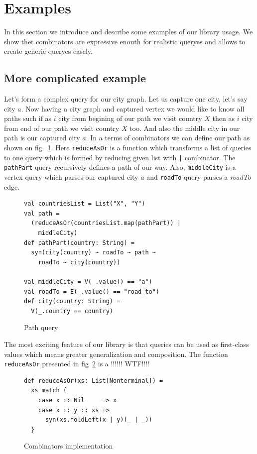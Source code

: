 \section{Examples}

In this section we introduce and describe some examples of our library usage.
We show thet combinators are expressive enouth for realistic queryes and allows to create generic queryes easely.

\subsection{More complicated example}

Let's form a complex query for our city graph. 
Let us capture one city, let's say city $a$. 
Now having a city graph and captured vertex we would like to know all paths such if as $i$ city from begining of our path we visit country $X$ then as $i$ city from end of our path we visit country $X$ too. 
And also the middle city in our path is our captured city $a$.
In a terms of combinators we can define our path as shown on fig.~\ref{fig:pathQuery}.
Here \lstinline{reduceAsOr} is a function which transforms a list of queries to one query which is formed by reducing given list with \lstinline{|} combinator.
The \lstinline{pathPart} query recursively defines a path of our way.
Also, \lstinline{middleCity} is a vertex query which parses our captured city $a$ and \lstinline{roadTo} query parses a \emph{roadTo} edge.

\begin{figure}[h]
\begin{lstlisting}
val countriesList = List("X", "Y")
val path = 
  (reduceAsOr(countriesList.map(pathPart)) | 
    middleCity)
def pathPart(country: String) =
  syn(city(country) ~ roadTo ~ path ~ 
    roadTo ~ city(country))

val middleCity = V(_.value() == "a")
val roadTo = E(_.value() == "road_to")
def city(country: String) =
  V(_.country == country)
\end{lstlisting}
\caption{Path query}
\label{fig:pathQuery}
\end{figure}


The most exciting feature of our library is that queries can be used as first-class values which means greater generalization and composition. 
The function \lstinline{reduceAsOr} presented in fig~\ref{fig:reduceAsOr} is a !!!!!! WTF!!!!

\begin{figure}[h]
\begin{lstlisting}
def reduceAsOr(xs: List[Nonterminal]) = 
  xs match {
    case x :: Nil     => x
    case x :: y :: xs => 
      syn(xs.foldLeft(x | y)(_ | _))
  }
\end{lstlisting}
\caption{Combinators implementation}
\label{fig:reduceAsOr}
\end{figure}

